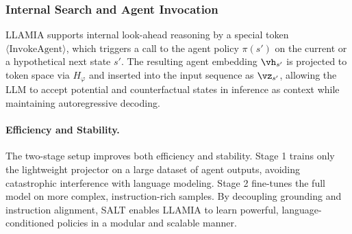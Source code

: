 \documentclass{article}
\theoremstyle{plain}
\theoremstyle{definition}
\theoremstyle{remark}
\begin{document}
\subsubsection{Internal Search and Agent Invocation}

LLAMIA supports internal look-ahead reasoning by a special token \(\langle\text{InvokeAgent}\rangle\), which triggers a call to the agent policy \(\pi(s')\) on the current or a hypothetical next state \(s'\). The resulting agent embedding \(\vh_{s'}\) is projected to token space via \(H_\varphi\) and inserted into the input sequence as \(\vz_{s'}\), allowing the LLM to accept potential and counterfactual states in inference as context while maintaining autoregressive decoding. 

\paragraph{Efficiency and Stability.}
The two-stage setup improves both efficiency and stability. Stage 1 trains only the lightweight projector on a large dataset of agent outputs, avoiding catastrophic interference with language modeling. Stage 2 fine-tunes the full model on more complex, instruction-rich samples. By decoupling grounding and instruction alignment, SALT enables LLAMIA to learn powerful, language-conditioned policies in a modular and scalable manner.
\end{document}

